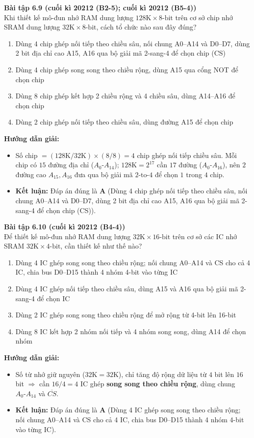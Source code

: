 \textbf{Bài tập 6.9 (cuối kì 20212 (B2-5); cuối kì 20212 (B5-4))}\\
Khi thiết kế mô-đun nhớ RAM dung lượng $128\text{K} \times 8\text{-bit}$ trên cơ sở chip nhớ SRAM dung lượng $32\text{K} \times 8\text{-bit}$, cách tổ chức nào sau đây đúng?
\begin{enumerate}[label=\Alph*.]
    \item Dùng 4 chip ghép nối tiếp theo chiều sâu, nối chung A0--A14 và D0--D7, dùng 2 bit địa chỉ cao A15, A16 qua bộ giải mã 2-sang-4 để chọn chip (CS)
    \item Dùng 4 chip ghép song song theo chiều rộng, dùng A15 qua cổng NOT để chọn chip
    \item Dùng 8 chip ghép kết hợp 2 chiều rộng và 4 chiều sâu, dùng A14--A16 để chọn chip
    \item Dùng 2 chip ghép nối tiếp theo chiều sâu, dùng đường A15 để chọn chip
\end{enumerate}
\textbf{Hướng dẫn giải:}
\begin{itemize}
    \item Số chip $= (128\text{K}/32\text{K}) \times (8/8) = 4$ chip ghép nối tiếp chiều sâu. Mỗi chip có $15$ đường địa chỉ ($A_0\text{-}A_{14}$); $128\text{K} = 2^{17}$ cần $17$ đường ($A_0\text{-}A_{16}$), nên $2$ đường cao $A_{15}, A_{16}$ đưa qua bộ giải mã $2\text{-to-}4$ để chọn $1$ trong $4$ chip.
    \item \textbf{Kết luận:} Đáp án đúng là \textbf{A} (Dùng 4 chip ghép nối tiếp theo chiều sâu, nối chung A0--A14 và D0--D7, dùng 2 bit địa chỉ cao A15, A16 qua bộ giải mã 2-sang-4 để chọn chip (CS)).
\end{itemize}

\textbf{Bài tập 6.10 (cuối kì 20212 (B4-4))}\\
Để thiết kế mô-đun nhớ RAM dung lượng $32\text{K} \times 16\text{-bit}$ trên cơ sở các IC nhớ SRAM $32\text{K} \times 4\text{-bit}$, cần thiết kế như thế nào?
\begin{enumerate}[label=\Alph*.]
    \item Dùng 4 IC ghép song song theo chiều rộng; nối chung A0--A14 và CS cho cả 4 IC, chia bus D0--D15 thành 4 nhóm 4-bit vào từng IC
    \item Dùng 4 IC ghép nối tiếp theo chiều sâu, dùng A15 và A16 qua bộ giải mã 2-sang-4 để chọn IC
    \item Dùng 2 IC ghép song song theo chiều rộng để mở rộng từ 4-bit lên 16-bit
    \item Dùng 8 IC kết hợp 2 nhóm nối tiếp và 4 nhóm song song, dùng A14 để chọn nhóm
\end{enumerate}
\textbf{Hướng dẫn giải:}
\begin{itemize}
    \item Số từ nhớ giữ nguyên ($32\text{K} = 32\text{K}$), chỉ tăng độ rộng dữ liệu từ $4$ bit lên $16$ bit $\Rightarrow$ cần $16 / 4 = 4$ IC ghép \textbf{song song theo chiều rộng}, dùng chung $A_0\text{-}A_{14}$ và $\overline{CS}$.
    \item \textbf{Kết luận:} Đáp án đúng là \textbf{A} (Dùng 4 IC ghép song song theo chiều rộng; nối chung A0--A14 và CS cho cả 4 IC, chia bus D0--D15 thành 4 nhóm 4-bit vào từng IC).
\end{itemize}

